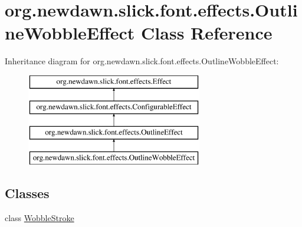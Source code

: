 \hypertarget{classorg_1_1newdawn_1_1slick_1_1font_1_1effects_1_1_outline_wobble_effect}{}\section{org.\+newdawn.\+slick.\+font.\+effects.\+Outline\+Wobble\+Effect Class Reference}
\label{classorg_1_1newdawn_1_1slick_1_1font_1_1effects_1_1_outline_wobble_effect}
Inheritance diagram for org.\+newdawn.\+slick.\+font.\+effects.\+Outline\+Wobble\+Effect\+:\begin{figure}[H]
\begin{center}
\leavevmode
\includegraphics[height=4.000000cm]{classorg_1_1newdawn_1_1slick_1_1font_1_1effects_1_1_outline_wobble_effect}
\end{center}
\end{figure}
\subsection*{Classes}
\begin{DoxyCompactItemize}
\item 
class \mbox{\hyperlink{classorg_1_1newdawn_1_1slick_1_1font_1_1effects_1_1_outline_wobble_effect_1_1_wobble_stroke}{Wobble\+Stroke}}
\end{DoxyCompactItemize}
